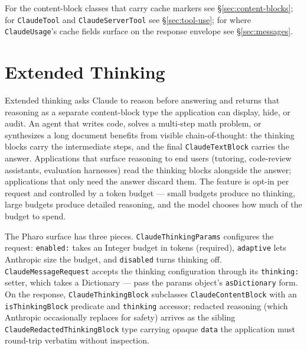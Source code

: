 \documentclass[a4paper,10pt,fleqn]{article}
\begin{document}
For the content-block classes that carry cache markers see
\S\ref{sec:content-blocks}; for \texttt{ClaudeTool} and
\texttt{ClaudeServerTool} see \S\ref{sec:tool-use}; for where
\texttt{ClaudeUsage}'s cache fields surface on the response
envelope see \S\ref{sec:messages}.

\medskip
{}

\section{Extended Thinking}
\label{sec:thinking}

Extended thinking asks Claude to reason before answering and returns
that reasoning as a separate content-block type the application can
display, hide, or audit.  An agent that writes code, solves a
multi-step math problem, or synthesizes a long document benefits from
visible chain-of-thought: the thinking blocks carry the intermediate
steps, and the final \texttt{ClaudeTextBlock} carries the answer.
Applications that surface reasoning to end users (tutoring,
code-review assistants, evaluation harnesses) read the thinking
blocks alongside the answer; applications that only need the answer
discard them.  The feature is opt-in per request and controlled by a
token budget --- small budgets produce no thinking, large budgets
produce detailed reasoning, and the model chooses how much of the
budget to spend.

\begin{sloppypar}
The Pharo surface has three pieces.  \texttt{ClaudeThinkingParams}
configures the request: \texttt{enabled:} takes an Integer budget in
tokens (required), \texttt{adaptive} lets Anthropic size the budget,
and \texttt{disabled} turns thinking off.  \texttt{ClaudeMessageRequest}
accepts the thinking configuration through its \texttt{thinking:}
setter, which takes a Dictionary --- pass the params object's
\texttt{asDictionary} form.  On the response,
\texttt{ClaudeThinkingBlock} subclasses \texttt{ClaudeContentBlock}
with an \texttt{isThinkingBlock} predicate and \texttt{thinking}
accessor; redacted reasoning (which Anthropic occasionally replaces
for safety) arrives as the sibling
\texttt{ClaudeRedactedThinkingBlock} type carrying opaque
\texttt{data} the application must round-trip verbatim without
inspection.
\end{sloppypar}
\end{document}
